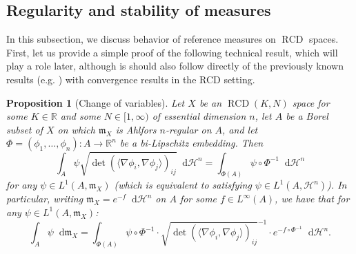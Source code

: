 \documentclass[11pt,reqno]{amsart}
\newtheorem{proposition}[theorem]{Proposition}
\theoremstyle{definition}
\numberwithin{equation}{section}
\newcommand{\fm}{\mathfrak{m}}
\newcommand{\di}{\mathop{}\!\mathrm{d}}
\newcommand{\meas}{\mathfrak{m}}
\DeclareMathOperator{\RCD}{RCD}
\newcommand{\haus}{\mathscr{H}}
\begin{document}
\subsection{Regularity and stability of measures}
In this subsection, we discuss behavior of reference measures on $\RCD$ spaces. First, let us provide a simple proof of the following technical result, which will play a role later, although is should also follow directly of the previously known results (e.g. \cite{Kir, Lit, Rcoarea}) with convergence results in the RCD setting.
\begin{proposition}[Change of variables]\label{coarea123}
Let $X$ be an $\RCD(K, N)$ space for some $K \in \mathbb{R}$ and some $N \in [1, \infty)$ of essential dimension $n$, let $A$ be a Borel subset of $X$ on which $\meas_X$ is Ahlfors $n$-regular on $A$, and let $\Phi=(\phi_1, \ldots, \phi_n):A \to \mathbb{R}^n$ be a bi-Lipschitz embedding.  
Then 
\begin{equation}\label{coarea14}
\int_{A}\psi\sqrt{\det(\langle \nabla \phi_i, \nabla \phi_j\rangle)_{ij}}\di \haus^n=\int_{\Phi(A)}\psi\circ \Phi^{-1}\di \haus^n
\end{equation}
for any $\psi \in L^1(A, \meas_X)$ (which is equivalent to satisfying $\psi \in L^1(A, \haus^n)$). 
In particular, writing $\meas_X=e^{-f}\di \haus^n$ on $A$ for some  $f \in L^{\infty}(A)$, we have that for any $\psi \in L^1(A, \fm_X)$:
\begin{equation}
    \int_A\psi\di \meas_X=\int_{\Phi(A)}\psi\circ \Phi^{-1} \cdot \sqrt{\det(\langle\nabla \phi_i, \nabla \phi_j\rangle)_{ij}}^{-1}\cdot e^{-f\circ \Phi^{-1}}\di \haus^n. 
\end{equation}
\end{proposition}
\end{document}
